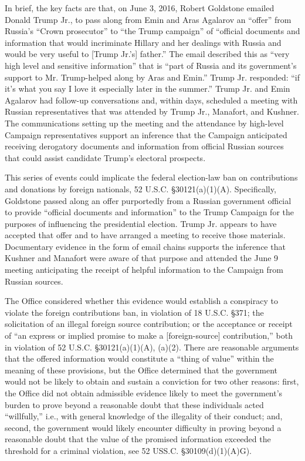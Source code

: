In brief, the key facts are that, on June 3, 2016, Robert Goldstone emailed Donald Trump Jr., to pass along from Emin and Aras Agalarov an ``offer'' from Russia's ``Crown prosecutor'' to ``the Trump campaign'' of ``official documents and information that would incriminate Hillary and her dealings with Russia and would be very useful to [Trump Jr.'s] father.''
The email described this as ``very high level and sensitive information'' that is ``part of Russia and its government's support to Mr. Trump-helped along by Aras and Emin.''
Trump Jr. responded: ``if it's what you say I love it especially later in the summer.''
Trump Jr. and Emin Agalarov had follow-up conversations and, within days, scheduled a meeting with Russian representatives that was attended by Trump Jr., Manafort, and Kushner. 
The communications setting up the meeting and the attendance by high-level Campaign representatives support an inference that the Campaign anticipated receiving derogatory documents and information from official Russian sources that could assist candidate Trump's electoral prospects.

This series of events could implicate the federal election-law ban on contributions and donations by foreign nationals, 52 U.S.C. \S 30121(a)(1)(A). 
Specifically, Goldstone passed along an offer purportedly from a Russian government official to provide ``official documents and information'' to the Trump Campaign for the purposes of influencing the presidential election. 
Trump Jr. appears to have accepted that offer and to have arranged a meeting to receive those materials. 
Documentary evidence in the form of email chains supports the inference that Kushner and Manafort were aware of that purpose and attended the June 9 meeting anticipating the receipt of helpful information to the Campaign from Russian sources.

The Office considered whether this evidence would establish a conspiracy to violate the foreign contributions ban, in violation of 18 U.S.C. \S 371; the solicitation of an illegal foreign source contribution; or the acceptance or receipt of ``an express or implied promise to make a [foreign-source] contribution,'' both in violation of 52 U.S.C. \S 30121(a)(1)(A), (a)(2). 
There are reasonable arguments that the offered information would constitute a ``thing of value'' within the meaning of these provisions, but the Office determined that the government would not be likely to obtain and sustain a conviction for two other reasons: first, the Office did not obtain admissible evidence likely to meet the government's burden to prove beyond a reasonable doubt that these individuals acted ``willfully,'' i.e., with general knowledge of the illegality of their conduct; and, second, the government would likely encounter difficulty in proving beyond a reasonable doubt that the value of the promised information exceeded the threshold for a criminal violation, see 52 USS.C. \S 30109(d)(1)(A)G).

